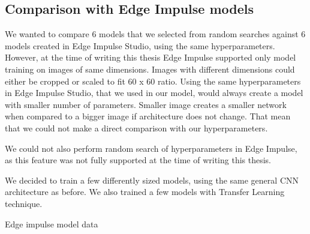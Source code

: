 \subsection{ Comparison with Edge Impulse models}

We wanted to compare 6 models that we selected from random searches against 6 models created in Edge Impulse Studio, using the same hyperparameters.
However, at the time of writing this thesis Edge Impulse supported only model training on images of same dimensions.
Images with different dimensions could either be cropped or scaled to fit 60 x 60 ratio.
Using the same hyperparameters in Edge Impulse Studio, that we used in our model, would always create a model with smaller number of parameters.
Smaller image creates a smaller network when compared to a bigger image if architecture does not change.
That mean that we could not make a direct comparison with our hyperparameters.

We could not also perform random search of hyperparameters in Edge Impulse, as this feature was not fully supported at the time of writing this thesis.

We decided to train a few differently sized models, using the same general CNN architecture as before.
We also trained a few models with Transfer Learning technique.

Edge impulse model data

\begin{table}[ht]
    \centering
    \caption{ Selected models}
    \label{ei_models}
\end{table}

